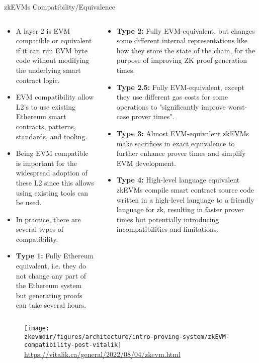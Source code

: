 \begin{frame}{zkEVMs Compatibility/Equivalence}
\begin{columns}
\begin{column}{0.46\textwidth}
\begin{itemize}
\footnotesize
\item A layer 2 is EVM compatible or equivalent if it can run EVM byte code without modifying the underlying smart contract logic. 
\item EVM compatibility allow L2's to use existing Ethereum smart contracts, patterns, standards, and tooling.
\item Being EVM compatible is important for the widespread adoption of these L2 since this allows using existing tools can be used.
\item In practice, there are several types of compatibility.
\item \textbf{Type 1:} Fully Ethereum equivalent, i.e. they do not change any part of the Ethereum system but generating proofs
can take several hours.
\end{itemize}
\end{column}
\begin{column}{0.51\textwidth}
\begin{itemize}
\footnotesize
\item \textbf{Type 2:} Fully EVM-equivalent, but changes some different internal representations like how they store the state of the chain, for the purpose of improving ZK proof generation times.
\item \textbf{Type 2.5:} Fully EVM-equivalent, except they use different gas costs for some operations to "significantly improve worst-case prover times".
\item \textbf{Type 3:} Almost EVM-equivalent zkEVMs make sacrifices in exact equivalence to further enhance prover times and simplify EVM development.
\item \textbf{Type 4:} High-level language equivalent zkEVMs compile smart contract source code written in a high-level language to a friendly language for zk, resulting in faster prover times but potentially introducing incompatibilities and limitations.
\end{itemize}
\end{column}
\end{columns}




\framebreak
\begin{figure}
\texttt{[image: \\zkevmdir/figures/architecture/intro-proving-system/zkEVM-compatibility-post-vitalik]}
\footnotesize
\url{https://vitalik.ca/general/2022/08/04/zkevm.html}
\end{figure}
\end{frame}





